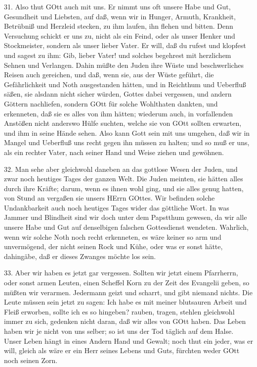 31. Also thut GOtt auch mit uns. Er nimmt uns oft unsere Habe und Gut, Gesundheit und Liebsten, auf daß, wenn wir in Hunger, Armuth, Krankheit, Betrübniß und Herzleid stecken, zu ihm laufen, ihn flehen und bitten. Denn Versuchung
schickt er uns zu, nicht als ein Feind, oder als unser Henker und Stockmeister, sondern als unser lieber Vater. Er will, daß du rufest und klopfest und sagest zu ihm: Gib, lieber Vater! und solches begehrest mit herzlichem Sehnen und Verlangen. Dahin müßte den Juden ihre Wüste und beschwerliches Reisen auch gereichen, und daß, wenn sie, aus der Wüste geführt, die Gefährlichkeit und Noth ausgestanden hätten, und in Reichthum und Ueberfluß säßen, sie alsdann nicht sicher würden, Gottes dabei vergessen, und andern Göttern nachliefen, sondern GOtt für solche Wohlthaten dankten, und erkenneten, daß sie es alles von ihm hätten; wiederum auch, in vorfallenden Anstößen nicht anderswo Hülfe suchten, welche sie von GOtt sollten erwarten, und ihm in seine Hände sehen. Also kann Gott sein mit uns umgehen, daß wir in Mangel und Ueberfluß uns recht gegen ihn müssen zu halten; und so muß er uns, als ein rechter Vater, nach seiner Hand und Weise ziehen und gewöhnen.

32. Man sehe aber gleichwohl daneben an das gottlose Wesen der Juden, und zwar noch heutiges Tages der ganzen Welt. Die Juden meinten, sie hätten alles durch ihre Kräfte; darum, wenn es ihnen wohl ging, und sie alles genug hatten, von Stund an vergaßen sie unsers HErrn GOttes. Wir befinden solche Undankbarkeit auch noch heutiges Tages wider das göttliche Wort. In was Jammer und Blindheit sind wir doch unter dem Papstthum gewesen, da wir alle unsere Habe und Gut auf denselbigen falschen Gottesdienst wendeten. Wahrlich, wenn wir solche Noth noch recht erkenneten, es wäre keiner so arm und unvermögend, der nicht seinen Rock und Kühe, oder was er sonst hätte, dahingäbe, daß er dieses Zwanges möchte los sein.

33. Aber wir haben es jetzt gar vergessen. Sollten wir jetzt einem Pfarrherrn, oder sonst armen Leuten, einen Scheffel Korn zu der Zeit des Evangelii geben, so müßten wir verarmen. Jedermann geizt und scharrt, und gibt niemand nichts. Die Leute müssen sein jetzt zu sagen: Ich habe es mit meiner blutsauren Arbeit und Fleiß erworben, sollte ich es so hingeben? rauben, tragen, stehlen gleichwohl immer zu sich, gedenken nicht daran, daß wir alles von GOtt haben. Das Leben haben wir je nicht von uns selber; so ist uns der Tod täglich auf dem Halse. Unser Leben hängt in eines Andern Hand und Gewalt; noch thut ein jeder, was er will, gleich als wäre er ein Herr seines Lebens und Guts, fürchten weder GOtt noch seinen Zorn.

